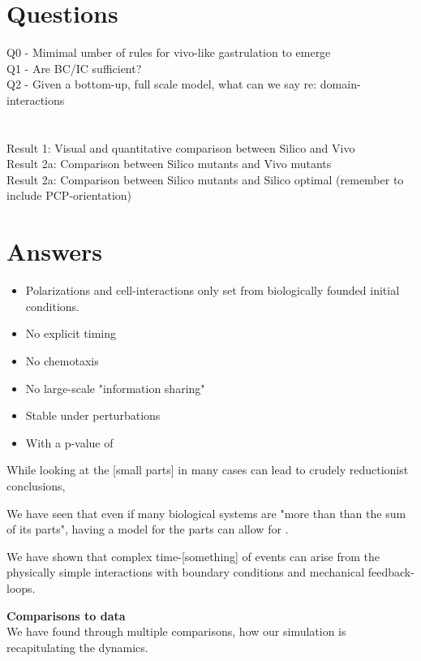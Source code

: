 \section{Questions}
Q0 - Mimimal umber of rules for vivo-like gastrulation to emerge\\
Q1 - Are BC/IC sufficient?\\
Q2 - Given a bottom-up, full scale model, what can we say re: domain-interactions\\
\\\\
Result 1: Visual and quantitative comparison between Silico and Vivo\\
Result 2a: Comparison between Silico mutants and Vivo mutants\\
Result 2a: Comparison between Silico mutants and Silico optimal (remember to include PCP-orientation)\\

\section{Answers}
\begin{itemize}
    \item Polarizations and cell-interactions only set from biologically founded initial conditions.
    \item No explicit timing
    \item No chemotaxis
    \item No large-scale "information sharing"
    \item Stable under perturbations
    \item With a p-value of 
\end{itemize}

While looking at the [small parts] in many cases can lead to crudely reductionist conclusions, 

We have seen that even if many biological systems are "more than than the sum of its parts", having a model for the parts can allow for .

We have shown that complex time-[something] of events can arise from the physically simple interactions with boundary conditions and mechanical feedback-loops.



\textbf{Comparisons to data}\\
We have found through multiple comparisons, how our simulation is recapitulating the dynamics.

